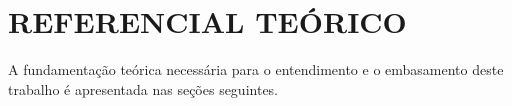 \chapter{REFERENCIAL TEÓRICO}
\label{cap:fundamentacao-teorica}


   A fundamentação teórica necessária para o entendimento e o embasamento deste trabalho é apresentada nas seções seguintes.

